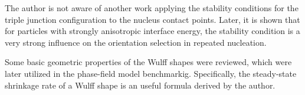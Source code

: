 The author is not aware of another work applying the stability conditions for the triple junction configuration to the nucleus contact points. Later, it is shown that for particles with strongly anisotropic interface energy, the stability condition is a very strong influence on the orientation selection in repeated nucleation.

Some basic geometric properties of the Wulff shapes were reviewed, which were later utilized in the phase-field model benchmarkig. Specifically, the steady-state shrinkage rate of a Wulff shape is an useful formula derived by the author.


%
%
